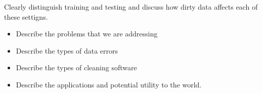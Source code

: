 Clearly distinguish training and testing and discuss how dirty data affects each of these settigns.

\begin{itemize}
    \item Describe the problems that we are addressing
    \item Describe the types of data errors
    \item Describe the types of cleaning software
    \item Describe the applications and potential utility to the world.
\end{itemize}

